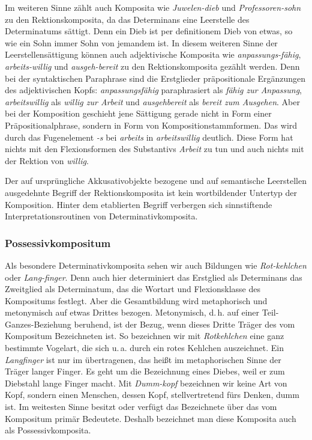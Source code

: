 Im weiteren Sinne zählt \citet[71]{Olsen1985} auch Komposita wie \textit{Juwelen-dieb} und \textit{Professoren-sohn} zu den Rektionskomposita, da das Determinans eine Leerstelle des Determinatums sättigt. Denn ein Dieb ist per definitionem Dieb von etwas, so wie ein Sohn immer Sohn von jemandem ist. In diesem weiteren Sinne der Leerstellensättigung können auch adjektivische Komposita wie \textit{anpassungs-fähig}, \textit{arbeits-willig} und \textit{ausgeh-bereit} zu den Rektionskomposita gezählt werden. Denn bei der syntaktischen Paraphrase sind die Erstglieder präpositionale Ergänzungen des adjektivischen Kopfs: \textit{anpassungsfähig} paraphrasiert als \textit{fähig zur Anpassung}, \textit{arbeitswillig} als \textit{willig zur Arbeit} und \textit{ausgehbereit} als \textit{bereit zum Ausgehen}. Aber bei der Komposition geschieht jene Sättigung gerade nicht in Form einer Präpositionalphrase, sondern in Form von Kompositionstammformen. Das wird durch das Fugenelement \textit{-s} bei \textit{arbeits} in \textit{arbeitswillig} deutlich. Diese Form hat nichts mit den Flexionsformen des Substantivs \textit{Arbeit} zu tun und auch nichts mit der Rektion von \textit{willig}. 

Der auf ursprüngliche Akkusativobjekte bezogene und auf semantische Leerstellen ausgedehnte Begriff der Rektionskomposita ist kein wortbildender Untertyp der Komposition. Hinter dem etablierten Begriff verbergen sich sinnstiftende Interpretationsroutinen von Determinativkomposita.


\subsubsection{Possessivkompositum}\label{subsubsection:PossKomp}

Als besondere Determinativkomposita sehen wir auch Bildungen wie \textit{Rot-kehlchen} oder \textit{Lang-finger}. Denn auch hier determiniert das Erstglied als Determinans das Zweitglied als Determinatum, das die Wortart und Flexionsklasse des Kompositums festlegt. Aber die Gesamtbildung wird metaphorisch und metonymisch auf etwas Drittes bezogen. Metonymisch, d.\,h. auf einer Teil-Ganzes-Beziehung beruhend, ist der Bezug, wenn dieses Dritte Träger des vom Kompositum Bezeichneten ist. So bezeichnen wir mit \textit{Rotkehlchen} eine ganz bestimmte Vogelart, die sich u.\,a. durch ein rotes Kehlchen auszeichnet. Ein \textit{Langfinger} ist nur im übertragenen, das heißt im metaphorischen Sinne der Träger langer Finger. Es geht um die Bezeichnung eines Diebes, weil er zum Diebstahl lange Finger macht. Mit \textit{Dumm-kopf} bezeichnen wir keine Art von Kopf, sondern einen Menschen, dessen Kopf, stellvertretend fürs Denken, dumm ist. Im weitesten Sinne besitzt oder verfügt das Bezeichnete über das vom Kompositum primär Bedeutete. Deshalb bezeichnet man diese Komposita auch als Possessivkomposita.

